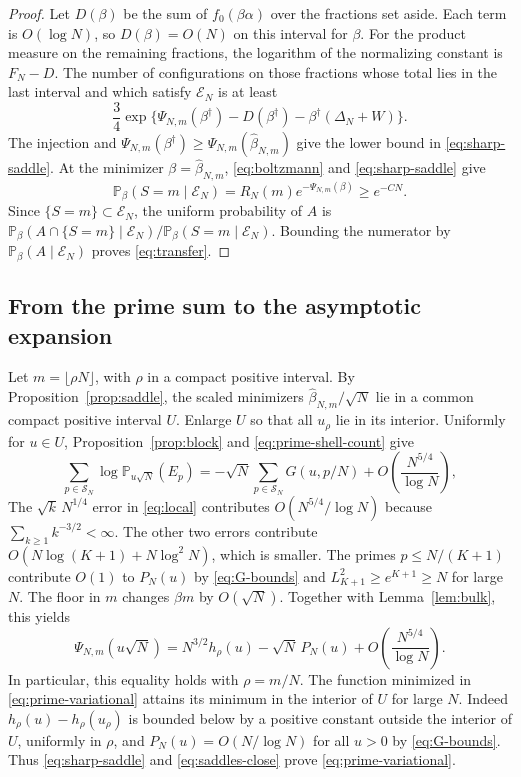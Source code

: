 \documentclass[11pt]{amsart}
\theoremstyle{remark}
\newcommand{\Pp}{\mathbb P}
\begin{document}
\begin{proof}
Let \(D(\beta)\) be the sum of \(f_0(\beta\alpha)\) over the fractions set aside. Each term is \(O(\log N)\), so \(D(\beta)=O(N)\) on this interval for \(\beta\). For the product measure on the remaining fractions, the logarithm of the normalizing constant is \(F_N-D\). The number of configurations on those fractions whose total lies in the last interval and which satisfy \(\mathcal E_N\) is at least
\[
 \frac34\exp\{\Psi_{N,m}(\beta^\dagger)-D(\beta^\dagger)
                         -\beta^\dagger(\Delta_N+W)\}.
\]
The injection and \(\Psi_{N,m}(\beta^\dagger)\ge\Psi_{N,m}(\widehat\beta_{N,m})\) give the lower bound in \eqref{eq:sharp-saddle}. At the minimizer \(\beta=\widehat\beta_{N,m}\), \eqref{eq:boltzmann}
and \eqref{eq:sharp-saddle} give
\[
 \Pp_\beta(S=m\mid\mathcal E_N)
   =R_N(m)e^{-\Psi_{N,m}(\beta)}\ge e^{-CN}.
\]
Since \(\{S=m\}\subset\mathcal E_N\), the uniform probability of \(A\)
is \(\Pp_\beta(A\cap\{S=m\}\mid\mathcal E_N)/\Pp_\beta(S=m\mid\mathcal E_N)\).
Bounding the numerator by \(\Pp_\beta(A\mid\mathcal E_N)\) proves
\eqref{eq:transfer}.
\end{proof}

\subsection{From the prime sum to the asymptotic expansion}

Let \(m=\lfloor\rho N\rfloor\), with \(\rho\) in a compact positive interval. By Proposition~\ref{prop:saddle}, the scaled minimizers \(\widehat\beta_{N,m}/\sqrt N\) lie in a common compact positive interval \(U\). Enlarge \(U\) so that all \(u_\rho\) lie in its interior. Uniformly for \(u\in U\), Proposition~\ref{prop:block} and \eqref{eq:prime-shell-count} give
\[
 \sum_{p\in\mathcal S_N}\log\Pp_{u\sqrt N}(E_p)
 =-\sqrt N\sum_{p\in\mathcal S_N}G(u,p/N)
    +O\!\left(\frac{N^{5/4}}{\log N}\right),
\]
The \(\sqrt k\,N^{1/4}\) error in \eqref{eq:local} contributes \(O(N^{5/4}/\log N)\) because \(\sum_{k\ge1}k^{-3/2}<\infty\). The other two errors contribute \(O(N\log(K+1)+N\log^2 N)\), which is smaller. The primes \(p\le N/(K+1)\) contribute \(O(1)\) to \(P_N(u)\) by \eqref{eq:G-bounds} and \(L_{K+1}^2\ge e^{K+1}\ge N\) for large \(N\). The floor in \(m\) changes \(\beta m\) by \(O(\sqrt N)\). Together with Lemma~\ref{lem:bulk}, this yields
\begin{equation}
 \Psi_{N,m}(u\sqrt N)=N^{3/2}h_\rho(u)-\sqrt N\,P_N(u)
    +O\!\left(\frac{N^{5/4}}{\log N}\right).
 \label{eq:saddles-close}
\end{equation}
In particular, this equality holds with \(\rho=m/N\). The function minimized in \eqref{eq:prime-variational} attains its minimum in the interior of \(U\) for large \(N\). Indeed \(h_\rho(u)-h_\rho(u_\rho)\) is bounded below by a positive constant outside the interior of \(U\), uniformly in \(\rho\), and \(P_N(u)=O(N/\log N)\) for all \(u>0\) by \eqref{eq:G-bounds}. Thus \eqref{eq:sharp-saddle} and \eqref{eq:saddles-close} prove \eqref{eq:prime-variational}.
\end{document}

